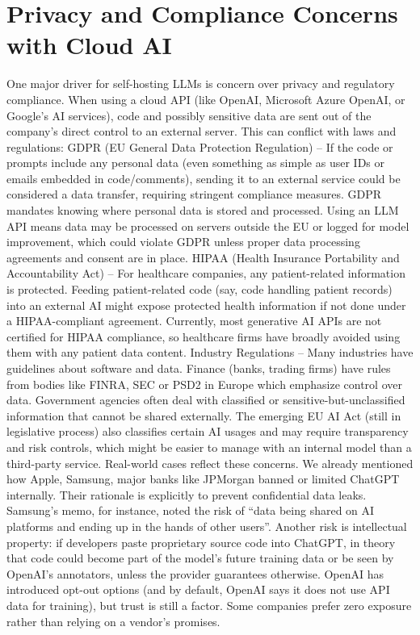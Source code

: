 \section{Privacy and Compliance Concerns with Cloud AI}
\label{sec:privacy-and-compliance-concerns-with-cloud-ai}
One major driver for self-hosting LLMs is concern over privacy and regulatory compliance. When using a cloud API (like OpenAI, Microsoft Azure OpenAI, or Google’s AI services), code and possibly sensitive data are sent out of the company’s direct control to an external server. This can conflict with laws and regulations:
GDPR (EU General Data Protection Regulation) – If the code or prompts include any personal data (even something as simple as user IDs or emails embedded in code/comments), sending it to an external service could be considered a data transfer, requiring stringent compliance measures. GDPR mandates knowing where personal data is stored and processed. Using an LLM API means data may be processed on servers outside the EU or logged for model improvement, which could violate GDPR unless proper data processing agreements and consent are in place.
HIPAA (Health Insurance Portability and Accountability Act) – For healthcare companies, any patient-related information is protected. Feeding patient-related code (say, code handling patient records) into an external AI might expose protected health information if not done under a HIPAA-compliant agreement. Currently, most generative AI APIs are not certified for HIPAA compliance, so healthcare firms have broadly avoided using them with any patient data content.
Industry Regulations – Many industries have guidelines about software and data. Finance (banks, trading firms) have rules from bodies like FINRA, SEC or PSD2 in Europe which emphasize control over data. Government agencies often deal with classified or sensitive-but-unclassified information that cannot be shared externally. The emerging EU AI Act (still in legislative process) also classifies certain AI usages and may require transparency and risk controls, which might be easier to manage with an internal model than a third-party service.
Real-world cases reflect these concerns. We already mentioned how Apple, Samsung, major banks like JPMorgan banned or limited ChatGPT internally​. Their rationale is explicitly to prevent confidential data leaks. Samsung’s memo, for instance, noted the risk of “data being shared on AI platforms and ending up in the hands of other users”​. Another risk is intellectual property: if developers paste proprietary source code into ChatGPT, in theory that code could become part of the model’s future training data or be seen by OpenAI’s annotators, unless the provider guarantees otherwise. OpenAI has introduced opt-out options (and by default, OpenAI says it does not use API data for training), but trust is still a factor. Some companies prefer zero exposure rather than relying on a vendor’s promises.

